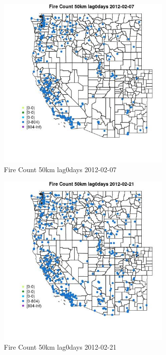 \begin{figure} 
\centering  
\includegraphics[width=0.77\textwidth]{Code_Outputs/Report_ML_input_PM25_Step4_part_f_de_duplicated_aves_prioritize_24hr_obswNAs_MapObsFire_Count_50km_lag0days2012-02-07.jpg} 
\caption{\label{fig:Report_ML_input_PM25_Step4_part_f_de_duplicated_aves_prioritize_24hr_obswNAsMapObsFire_Count_50km_lag0days2012-02-07}Fire Count 50km lag0days 2012-02-07} 
\end{figure} 
 

\begin{figure} 
\centering  
\includegraphics[width=0.77\textwidth]{Code_Outputs/Report_ML_input_PM25_Step4_part_f_de_duplicated_aves_prioritize_24hr_obswNAs_MapObsFire_Count_50km_lag0days2012-02-21.jpg} 
\caption{\label{fig:Report_ML_input_PM25_Step4_part_f_de_duplicated_aves_prioritize_24hr_obswNAsMapObsFire_Count_50km_lag0days2012-02-21}Fire Count 50km lag0days 2012-02-21} 
\end{figure} 
 

